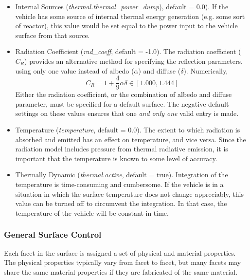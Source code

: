 \begin{itemize}
\item {Internal Sources (\textit{thermal.thermal\_power\_dump}), default =
0.0)}.\newline
If the vehicle has some source of internal thermal energy generation (e.g. some sort of reactor), this value would be set equal to the power input to the vehicle surface from that source.

\item {Radiation Coefficient (\textit{rad\_coeff}, default = -1.0)}.\newline
The radiation coefficient ($C_R$) provides an alternative method for specifying the
reflection parameters, using only one value instead of albedo ($\alpha$) and
diffuse ($\delta$).
Numerically,
\begin{equation*}
C_R = 1 + \frac{4}{9} \alpha \delta \in [1.000 , 1.444]
\end{equation*}
Either the radiation coefficient, or the combination of albedo and diffuse
parameter, must be specified for a default surface.  The negative default
settings on these values ensures that one \textit{and only one} valid entry is
made.

\item {Temperature (\textit{temperature}, default = 0.0)}.\newline
The extent to which radiation is absorbed and emitted has an effect on temperature, and vice versa.  Since the radiation model includes pressure from thermal radiative emission, it is important that the temperature is known to some level of accuracy.

\item {Thermally Dynamic (\textit{thermal.active}, default = true)}.\newline
Integration of the temperature is time-consuming and cumbersome.  If the vehicle is in a situation in which the surface temperature does not change appreciably, this value can be turned off to circumvent the integration.  In that case, the temperature of the vehicle will be constant in time.

\end{itemize}


\subsubsection{General Surface Control}
Each facet in the surface is assigned a set of physical and material properties.  The physical properties typically vary from facet to facet, but many facets may share the same material properties if they are fabricated of the same material.

